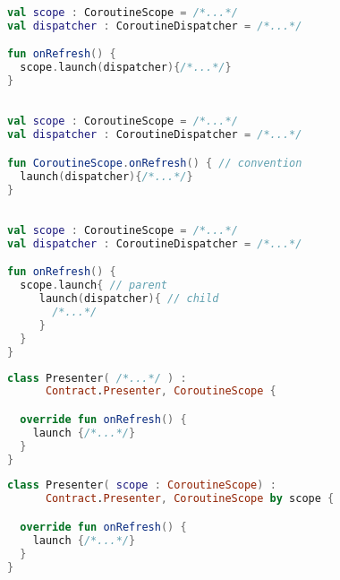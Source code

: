 \documentclass[10pt]{beamer}
\begin{document}
\begin{frame}[fragile]
\begin{lstlisting}[language=Kotlin, basicstyle=\ttfamily]

val scope : CoroutineScope = /*...*/
val dispatcher : CoroutineDispatcher = /*...*/

fun onRefresh() {
  scope.launch(dispatcher){/*...*/}
}
\end{lstlisting}
\end{frame}

\begin{frame}[fragile]
\begin{lstlisting}[language=Kotlin, basicstyle=\ttfamily]

val scope : CoroutineScope = /*...*/
val dispatcher : CoroutineDispatcher = /*...*/

fun CoroutineScope.onRefresh() { // convention 
  launch(dispatcher){/*...*/}
}

\end{lstlisting}
\end{frame}



\begin{frame}[fragile]
\begin{lstlisting}[language=Kotlin, basicstyle=\ttfamily]

val scope : CoroutineScope = /*...*/
val dispatcher : CoroutineDispatcher = /*...*/

fun onRefresh() {
  scope.launch{ // parent 
     launch(dispatcher){ // child 
       /*...*/
     }
  }
}
\end{lstlisting}
\end{frame}

\begin{frame}[fragile]
\begin{lstlisting}[language=Kotlin, basicstyle=\ttfamily]
class Presenter( /*...*/ ) : 
      Contract.Presenter, CoroutineScope {

  override fun onRefresh() {
    launch {/*...*/}
  }
}
\end{lstlisting}
\end{frame}

\begin{frame}[fragile]
\begin{lstlisting}[language=Kotlin, basicstyle=\ttfamily]
class Presenter( scope : CoroutineScope) : 
      Contract.Presenter, CoroutineScope by scope {

  override fun onRefresh() {
    launch {/*...*/}
  }
}
\end{lstlisting}
\end{frame}
\end{document}
